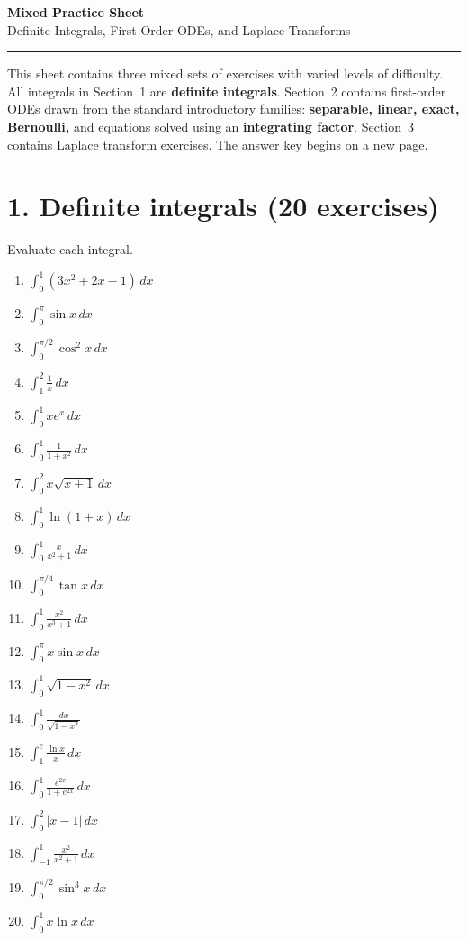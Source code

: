 \documentclass[11pt,a4paper]{article}
\begin{document}
\begin{center}
    {\LARGE \textbf{Mixed Practice Sheet}}\\[0.4em]
    {\large Definite Integrals, First-Order ODEs, and Laplace Transforms}\\[0.8em]
    \rule{0.9\textwidth}{0.6pt}
\end{center}

\vspace{0.6em}

This sheet contains three mixed sets of exercises with varied levels of difficulty. All integrals in Section~1 are \textbf{definite integrals}. Section~2 contains first-order ODEs drawn from the standard introductory families: \textbf{separable, linear, exact, Bernoulli,} and equations solved using an \textbf{integrating factor}. Section~3 contains Laplace transform exercises. The answer key begins on a new page.

\section*{1. Definite integrals (20 exercises)}
Evaluate each integral.

\begin{enumerate}
    \item $\displaystyle \int_0^1 (3x^2+2x-1)\,dx$
    \item $\displaystyle \int_0^{\pi} \sin x\,dx$
    \item $\displaystyle \int_0^{\pi/2} \cos^2 x\,dx$
    \item $\displaystyle \int_1^2 \frac{1}{x}\,dx$
    \item $\displaystyle \int_0^1 x e^x\,dx$
    \item $\displaystyle \int_0^1 \frac{1}{1+x^2}\,dx$
    \item $\displaystyle \int_0^2 x\sqrt{x+1}\,dx$
    \item $\displaystyle \int_0^1 \ln(1+x)\,dx$
    \item $\displaystyle \int_0^1 \frac{x}{x^2+1}\,dx$
    \item $\displaystyle \int_0^{\pi/4} \tan x\,dx$
    \item $\displaystyle \int_0^1 \frac{x^2}{x^3+1}\,dx$
    \item $\displaystyle \int_0^{\pi} x\sin x\,dx$
    \item $\displaystyle \int_0^1 \sqrt{1-x^2}\,dx$
    \item $\displaystyle \int_0^1 \frac{dx}{\sqrt{1-x^2}}$
    \item $\displaystyle \int_1^e \frac{\ln x}{x}\,dx$
    \item $\displaystyle \int_0^1 \frac{e^{2x}}{1+e^{2x}}\,dx$
    \item $\displaystyle \int_0^2 |x-1|\,dx$
    \item $\displaystyle \int_{-1}^1 \frac{x^2}{x^2+1}\,dx$
    \item $\displaystyle \int_0^{\pi/2} \sin^3 x\,dx$
    \item $\displaystyle \int_0^1 x\ln x\,dx$
\end{enumerate}
\end{document}
